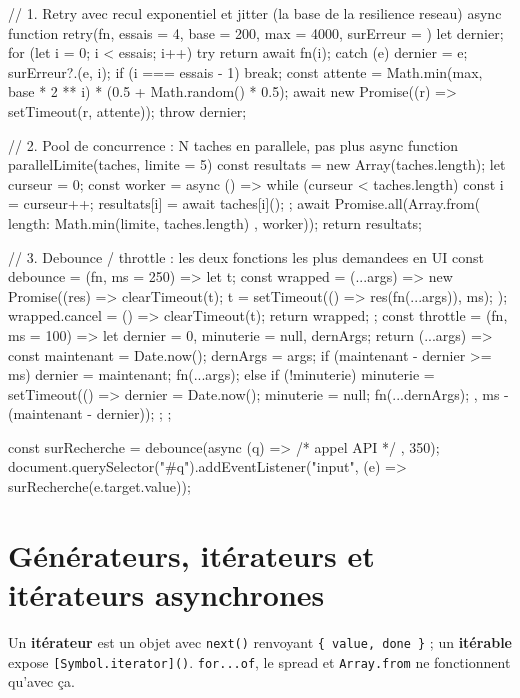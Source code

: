 \documentclass[12pt,a4paper,twoside,openright]{book}
\begin{document}
\begin{codejs}
// 1. Retry avec recul exponentiel et jitter (la base de la resilience reseau)
async function retry(fn, { essais = 4, base = 200, max = 4000, surErreur } = {}) {
  let dernier;
  for (let i = 0; i < essais; i++) {
    try { return await fn(i); }
    catch (e) {
      dernier = e;
      surErreur?.(e, i);
      if (i === essais - 1) break;
      const attente = Math.min(max, base * 2 ** i) * (0.5 + Math.random() * 0.5);
      await new Promise((r) => setTimeout(r, attente));
    }
  }
  throw dernier;
}

// 2. Pool de concurrence : N taches en parallele, pas plus
async function parallelLimite(taches, limite = 5) {
  const resultats = new Array(taches.length);
  let curseur = 0;
  const worker = async () => {
    while (curseur < taches.length) {
      const i = curseur++;
      resultats[i] = await taches[i]();
    }
  };
  await Promise.all(Array.from({ length: Math.min(limite, taches.length) }, worker));
  return resultats;
}

// 3. Debounce / throttle : les deux fonctions les plus demandees en UI
const debounce = (fn, ms = 250) => {
  let t;
  const wrapped = (...args) => new Promise((res) => {
    clearTimeout(t);
    t = setTimeout(() => res(fn(...args)), ms);
  });
  wrapped.cancel = () => clearTimeout(t);
  return wrapped;
};
const throttle = (fn, ms = 100) => {
  let dernier = 0, minuterie = null, dernArgs;
  return (...args) => {
    const maintenant = Date.now();
    dernArgs = args;
    if (maintenant - dernier >= ms) { dernier = maintenant; fn(...args); }
    else if (!minuterie) minuterie = setTimeout(() => {
      dernier = Date.now(); minuterie = null; fn(...dernArgs);
    }, ms - (maintenant - dernier));
  };
};

const surRecherche = debounce(async (q) => { /* appel API */ }, 350);
document.querySelector("#q").addEventListener("input", (e) => surRecherche(e.target.value));
\end{codejs}

\section{G\'en\'erateurs, it\'erateurs et it\'erateurs asynchrones}

Un \textbf{it\'erateur} est un objet avec \verb|next()| renvoyant \verb|{ value, done }| ;
un \textbf{it\'erable} expose \verb|[Symbol.iterator]()|. \verb|for...of|, le spread et
\verb|Array.from| ne fonctionnent qu'avec \c{c}a.
\end{document}
